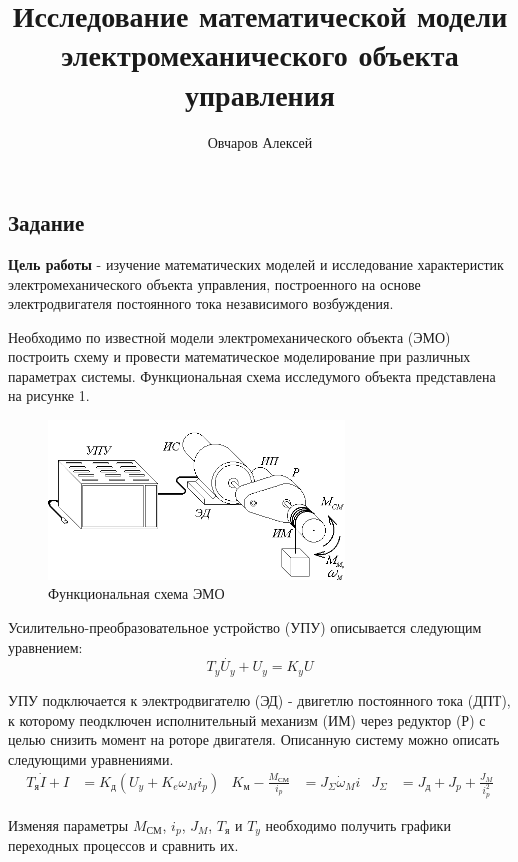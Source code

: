 \documentclass[a4paper, 12pt]{article}
\author{Овчаров Алексей}
\title{Исследование математической модели электромеханического объекта управления}
\begin{document}
\maketitle

\begin{center}
\section{Задание}
\end{center} \par
\textbf{Цель работы} - изучение математических моделей и исследование характеристик электромеханического объекта управления, построенного на основе электродвигателя постоянного тока независимого возбуждения. \par
Необходимо по известной модели электромеханического объекта (ЭМО) построить схему и провести математическое моделирование при различных параметрах системы. Функциональная схема исследумого объекта представлена на рисунке 1.
\begin{figure} [h!]
    \centering
    \includegraphics[width = 0.7\textwidth]{images/EMO.png}
    \caption{Функциональная схема ЭМО}
\end{figure} \par
Усилительно-преобразовательное устройство (УПУ) описывается следующим уравнением:
\begin{equation}
    T_y\dot{U_y} + U_y = K_yU
\end{equation} \par
УПУ подключается к электродвигателю (ЭД) - двигетлю постоянного тока (ДПТ), к которому пеодключен исполнительный механизм (ИМ) через редуктор (Р) с целью снизить момент на роторе двигателя. Описанную систему можно описать следующими уравнениями.
\begin{align*}
    T_\text{я}\dot{I} + I & = K_\text{д}(U_y + K_e\omega_Mi_p) &
    K_\text{м} - \frac{M_\text{СМ}}{i_p} & = J_\Sigma\dot{\omega}_Mi &
    J_\Sigma & = J_\text{д} + J_p + \frac{J_M}{i_p^2}
\end{align*} \par
Изменяя параметры $M_\text{СМ}$, $i_p$, $J_M$, $T_\text{я}$ и $T_y$ необходимо получить графики переходных процессов и сравнить их.
\end{document}
